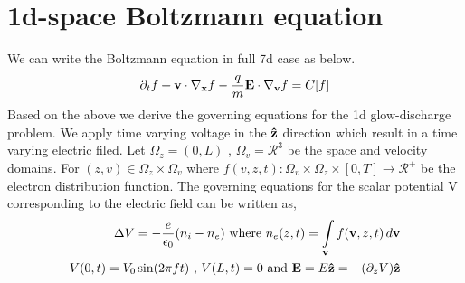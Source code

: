 \documentclass{article}[draft]
\begin{document}
\clearpage
\section{1d-space Boltzmann equation}
\label{sec:1d_bte}

We can write the Boltzmann equation in full 7d case as below. 
\begin{align*}
\partial_t f + \mathbf{v}\cdot \nabla_{\mathbf{x}} f -\frac{q}{m} \mathbf{E} \cdot \nabla_{\mathbf{v}} f = C[f]
\end{align*}
Based on the above we derive the governing equations for the 1d glow-discharge problem. We apply time varying voltage in the $\mathbf{\hat{z}}$ direction which result in a time varying electric filed. Let $\Omega_z=(0, L)$ , $\Omega_v= \mathcal{R}^3$ be the space and velocity domains. For $(z, v) \in \Omega_{z} \times \Omega_v$ where $f (v, z, t) : \Omega_{v} \times \Omega_{z} × [0,T] \rightarrow \mathcal{R}^{+}$ be the electron distribution function. The governing equations for the scalar potential V corresponding to the electric field can be written as,
\begin{align*}
	\Delta V = -\frac{e}{\epsilon_0} (n_i-n_e) \text{ where } n_e(z,t) = \myint_{\vect{v}} f(\vect{v}, z, t) \diff{\vect{v}} \\
	V(0,t) = V_0 \sin(2\pi ft) \text{ , } V(L,t) = 0 \text{ and } \vect{E} = E \vect{\hat{z}} = -\of{\partial_z V} \vect{\hat{z}}
\end{align*} 
\end{document}
